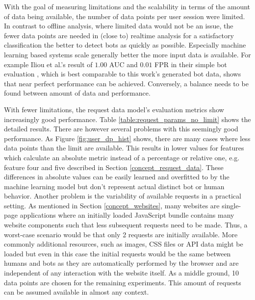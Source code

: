\documentclass[
    fontsize=12pt,
    headings=small,
    parskip=half,           %
    bibliography=totoc,
    numbers=noenddot,       %
    open=any,               %
    final,                   %
    table
]{scrreprt}
\begin{document}

With the goal of measuring limitations and the scalability in terms of the amount of data being available, the number of data points per user session were limited. In contrast to offline analysis, where limited data would not be an issue, the fewer data points are needed in (close to) realtime analysis for a satisfactory classification the better to detect bots as quickly as possible. Especially machine learning based systems scale generally better the more input data is available. For example Iliou et al.'s result of $1.00$ AUC and $0.01$ FPR in their simple bot evaluation \cite{10.1145/3339252.3339267}, which is best comparable to this work's generated bot data, shows that near perfect performance can be achieved. Conversely, a balance needs to be found between amount of data and performance.

With fewer limitations, the request data model's evaluation metrics show increasingly good performance. Table \ref{table:request_params_no_limit} shows the detailed results. There are however several problems with this seemingly good performance. As Figure \ref{fig:user_dp_hist} shows, there are many cases where less data points than the limit are available. This results in lower values for features which calculate an absolute metric instead of a percentage or relative one, e.g. feature four and five described in Section \ref{concept_request_data}. These differences in absolute values can be easily learned and overfitted to by the machine learning model but don't represent actual distinct bot or human behavior.
Another problem is the variability of available requests in a practical setting. As mentioned in Section \ref{concept_websites}, many websites are single-page applications where an initially loaded JavaScript bundle contains many website components such that less subsequent requests need to be made. Thus, a worst-case scenario would be that only 2 requests are initially available. More commonly additional resources, such as images, CSS files or API data might be loaded but even in this case the initial requests would be the same between humans and bots as they are automatically performed by the browser and are independent of any interaction with the website itself. As a middle ground, 10 data points are chosen for the remaining experiments. This amount of requests can be assumed available in almost any context.
\end{document}
